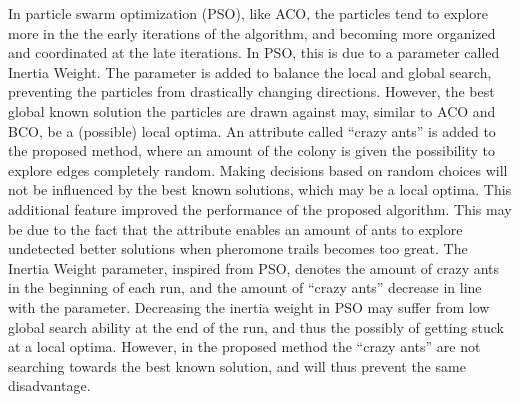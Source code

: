 
In particle swarm optimization (PSO), like ACO, the particles tend to explore more in the the early iterations of the algorithm, and becoming more organized and coordinated at the late iterations. In PSO, this is due to a parameter called Inertia Weight. The parameter is added to balance the local and global search, preventing the particles from drastically changing directions. However, the best global known solution the particles are drawn against may, similar to ACO and BCO, be a (possible) local optima. An attribute called ``crazy ants'' is added to the proposed method, where an amount of the colony is given the possibility to explore edges completely random. Making decisions based on random choices will not be influenced by the best known solutions, which may be a local optima. This additional feature improved the performance of the proposed algorithm. This may be due to the fact that the attribute enables an amount of ants to explore undetected better solutions when pheromone trails becomes too great. The Inertia Weight parameter, inspired from PSO, denotes the amount of crazy ants in the beginning of each run, and the amount of ``crazy ants'' decrease in line with the parameter. Decreasing the inertia weight in PSO may suffer from low global search ability at the end of the run, and thus the possibly of getting stuck at a local optima. However, in the proposed method the ``crazy ants'' are not searching towards the best known solution, and will thus prevent the same disadvantage. 


